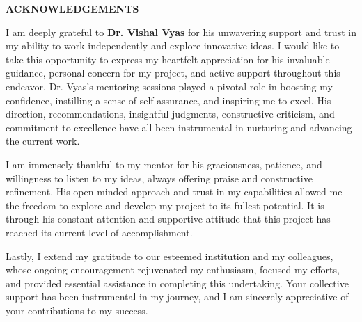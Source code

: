 
\newpage
\begin{center}
{\large \bf ACKNOWLEDGEMENTS}
\end{center}
I am deeply grateful to \textbf{Dr. Vishal Vyas} for his unwavering support and trust in my ability to work independently and explore innovative ideas. I would like to take this opportunity to express my heartfelt appreciation for his invaluable guidance, personal concern for my project, and active support throughout this endeavor. Dr. Vyas's mentoring sessions played a pivotal role in boosting my confidence, instilling a sense of self-assurance, and inspiring me to excel. His direction, recommendations, insightful judgments, constructive criticism, and commitment to excellence have all been instrumental in nurturing and advancing the current work.

I am immensely thankful to my mentor for his graciousness, patience, and willingness to listen to my ideas, always offering praise and constructive refinement. His open-minded approach and trust in my capabilities allowed me the freedom to explore and develop my project to its fullest potential. It is through his constant attention and supportive attitude that this project has reached its current level of accomplishment.

Lastly, I extend my gratitude to our esteemed institution and my colleagues, whose ongoing encouragement rejuvenated my enthusiasm, focused my efforts, and provided essential assistance in completing this undertaking. Your collective support has been instrumental in my journey, and I am sincerely appreciative of your contributions to my success.